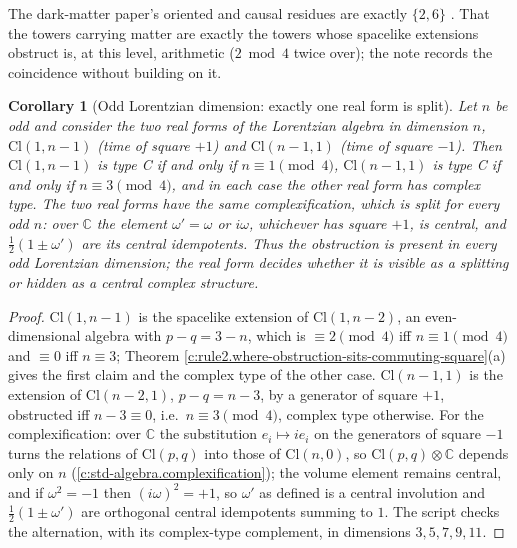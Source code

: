 \documentclass[11pt]{article}
\newtheorem{corollary}[theorem]{Corollary}
\theoremstyle{definition}
\theoremstyle{plain}
\providecommand{\C}{}\renewcommand{\C}{\mathbb{C}}
\providecommand{\Cl}{}\renewcommand{\Cl}{\mathrm{Cl}}
\begin{document}
\label{c:note.rule2.setting-one-dimensional-extensions-even-dimensional-2}
The dark-matter paper's oriented and causal residues are exactly $\{2, 6\}$ \cite[Cor.~3.11]{ButlerT14}. That the towers carrying matter are exactly the towers whose spacelike extensions obstruct is, at this level, arithmetic ($2 \bmod 4$ twice over); the note records the coincidence without building on it.

\begin{corollary}[Odd Lorentzian dimension: exactly one real form is split]\label{c:rule2.odd-lorentzian-dimension-exactly-one-real}
Let $n$ be odd and consider the two real forms of the Lorentzian algebra in dimension $n$, $\Cl(1,n{-}1)$ (time of square $+1$) and $\Cl(n{-}1,1)$ (time of square $-1$). Then $\Cl(1,n{-}1)$ is type C if and only if $n \equiv 1 \pmod 4$, $\Cl(n{-}1,1)$ is type C if and only if $n \equiv 3 \pmod 4$, and in each case the other real form has complex type. The two real forms have the same complexification, which is split for every odd $n$: over $\C$ the element $\omega' = \omega$ or $i\omega$, whichever has square $+1$, is central, and $\tfrac12(1 \pm \omega')$ are its central idempotents. Thus the obstruction is present in every odd Lorentzian dimension; the real form decides whether it is visible as a splitting or hidden as a central complex structure.
\end{corollary}
\begin{proof}
$\Cl(1,n{-}1)$ is the spacelike extension of $\Cl(1,n{-}2)$, an even-dimensional algebra with $p - q = 3 - n$, which is $\equiv 2 \pmod 4$ iff $n \equiv 1 \pmod 4$ and $\equiv 0$ iff $n \equiv 3$; Theorem \ref{c:rule2.where-obstruction-sits-commuting-square}(a) gives the first claim and the complex type of the other case. $\Cl(n{-}1,1)$ is the extension of $\Cl(n{-}2,1)$, $p - q = n - 3$, by a generator of square $+1$, obstructed iff $n - 3 \equiv 0$, i.e.\ $n \equiv 3 \pmod 4$, complex type otherwise. For the complexification: over $\C$ the substitution $e_i \mapsto ie_i$ on the generators of square $-1$ turns the relations of $\Cl(p,q)$ into those of $\Cl(n,0)$, so $\Cl(p,q) \otimes \C$ depends only on $n$ (\ref{c:std-algebra.complexification}); the volume element remains central, and if $\omega^2 = -1$ then $(i\omega)^2 = +1$, so $\omega'$ as defined is a central involution and $\tfrac12(1 \pm \omega')$ are orthogonal central idempotents summing to $1$. The script checks the alternation, with its complex-type complement, in dimensions $3, 5, 7, 9, 11$.

\end{proof}
\end{document}
